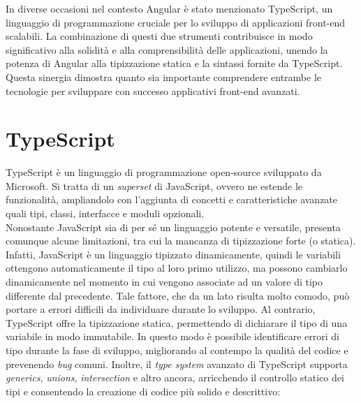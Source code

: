 In diverse occasioni nel contesto Angular è stato menzionato TypeScript, un linguaggio di programmazione cruciale per lo sviluppo di applicazioni front-end scalabili. La combinazione di questi due strumenti contribuisce in modo significativo alla solidità e alla comprensibilità delle applicazioni, unendo la potenza di Angular alla tipizzazione statica e la sintassi fornite da TypeScript. Questa sinergia dimostra quanto sia importante comprendere entrambe le tecnologie per sviluppare con successo applicativi front-end avanzati.

\section{TypeScript}

TypeScript è un linguaggio di programmazione open-source sviluppato da Microsoft. Si tratta di un \textit{superset} di JavaScript, ovvero ne estende le funzionalità, ampliandolo con l’aggiunta di concetti e caratteristiche avanzate quali tipi, classi, interfacce e moduli opzionali.\cite{TYPESCRIPT_geekandjob}\\
Nonostante JavaScript sia di per sé un linguaggio potente e versatile, presenta comunque alcune limitazioni, tra cui la mancanza di tipizzazione forte (o statica). Infatti, JavaScript è un linguaggio tipizzato dinamicamente, quindi le variabili ottengono automaticamente il tipo al loro primo utilizzo, ma possono cambiarlo dinamicamente nel momento in cui vengono associate ad un valore di tipo differente dal precedente. Tale fattore, che da un lato risulta molto comodo, può portare a errori difficili da individuare durante lo sviluppo. Al contrario, TypeScript offre la tipizzazione statica, permettendo di dichiarare il tipo di una variabile in modo immutabile. In questo modo è possibile identificare errori di tipo durante la fase di sviluppo, migliorando al contempo la qualità del codice e prevenendo \textit{bug} comuni. Inoltre, il \textit{type system} avanzato di TypeScript supporta \textit{generics}, \textit{unions}, \textit{intersection} e altro ancora, arricchendo il controllo statico dei tipi e consentendo la creazione di codice più solido e descrittivo\cite{TYPESCRIPT_kinsta}:

